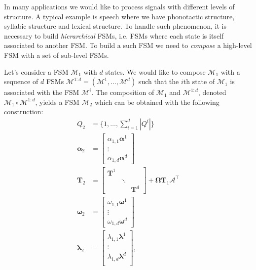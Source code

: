In many applications we would like to process signals with different levels of
structure. A typical example is speech where we have phonotactic
structure, syllabic structure and lexical structure. To handle such
phenomenon, it is necessary to build \emph{hierarchical} FSMs, i.e.
FSMs where each state is itself associated to another FSM. To build a
such FSM we need to \emph{compose} a high-level FSM with a set of
sub-level FSMs.

Let's consider a FSM $\mathcal{M}_1$ with $d$ states. We would like to
compose $\mathcal{M}_1$ with a sequence of $d$ FSMs $\mathcal{M}^{1:d} = (\mathcal{M}^1, \dots, \mathcal{M}^d)$
such that the $i$th state of $\mathcal{M}_1$ is associated with the
FSM $\mathcal{M}^i$. The composition of $\mathcal{M}_1$ and $\mathcal{M}^{1:d}$,
denoted $\mathcal{M}_1 \circ \mathcal{M}^{1:d}$, yields a FSM $\mathcal{M}_2$
which can be obtained with the following construction:
\begin{align}
    Q_2 &= \{1, \dots, \sum_{i=1}^d |Q^i| \} \\
    \boldsymbol{\alpha}_2 &=
        \begin{bmatrix}
            \alpha_{1,1} \boldsymbol{\alpha}^1 \\
            \vdots \\
            \alpha_{1,d} \boldsymbol{\alpha}^d
        \end{bmatrix} \\
    \mathbf{T}_2 &= \begin{bmatrix}
        \mathbf{T}^1 & & \\
        & \ddots & \\
        & & \mathbf{T}^d
    \end{bmatrix} +
        \boldsymbol{\Omega} \mathbf{T}_1 \boldsymbol{\mathcal{A}}^\top \\
    \boldsymbol{\omega}_2 &=
        \begin{bmatrix}
            \omega_{1,1} \boldsymbol{\omega}^1 \\
            \vdots \\
            \omega_{1,d} \boldsymbol{\omega}^d
        \end{bmatrix} \\
    \boldsymbol{\lambda}_2 &= \begin{bmatrix}
        \lambda_{1,1} \boldsymbol{\lambda}^1 \\
        \vdots \\
        \lambda_{1,d} \boldsymbol{\lambda}^d \\
    \end{bmatrix},
\end{align}
